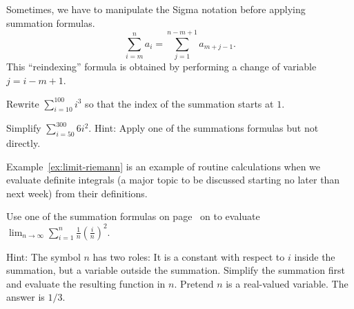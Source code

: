 \documentclass[../main.tex]{subfiles}
\begin{document}
Sometimes, we have to manipulate the Sigma notation before applying summation formulas.
\begin{equation} \label{eq:summation-reindex}
  \sum_{i=m}^{n} a_{i} = \sum_{j = 1}^{n - m + 1} a_{m+j-1}.
\end{equation}
This ``reindexing'' formula is obtained by performing a change of variable \(j = i - m + 1\).
\begin{example}
  Rewrite \(\sum_{i=10}^{100} i^{3}\) so that the index of the summation starts at \(1\).
\end{example}

\begin{example} 
  Simplify \(\sum_{i=50}^{300} 6 i^{2}\).  {\footnotesize Hint: Apply one of the summations formulas but not directly.}
\end{example}
\clearpage

Example~\ref{ex:limit-riemann} is an example of routine calculations when we evaluate definite integrals (a major topic to be discussed starting no later than next week) from their definitions.
\begin{example} \label{ex:limit-riemann}
  Use one of the summation formulas on page~\pageref{formula:summations} on to evaluate \(\lim_{n \to \infty} \sum_{i=1}^{n} \frac{1}{n} \left( \frac{i}{n} \right)^{2}\).  

  {\footnotesize Hint: The symbol \(n\) has two roles: It is a constant with respect to \(i\) inside the summation, but a variable outside the summation. Simplify the summation first and evaluate the resulting function in \(n\). Pretend \(n\) is a real-valued variable. The answer is \(1/3\).}
\end{example}
\end{document}
